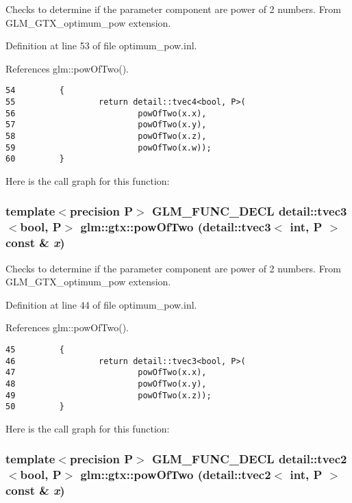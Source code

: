 Checks to determine if the parameter component are power of 2 numbers. From GLM\_\-GTX\_\-optimum\_\-pow extension. 

Definition at line 53 of file optimum\_\-pow.inl.

References glm::powOfTwo().

\begin{Code}\begin{verbatim}54         {
55                 return detail::tvec4<bool, P>(
56                         powOfTwo(x.x),
57                         powOfTwo(x.y),
58                         powOfTwo(x.z),
59                         powOfTwo(x.w));
60         }
\end{verbatim}
\end{Code}




Here is the call graph for this function:\hypertarget{group__gtx__optimum__pow_g9225089c241c18df4ff3548949f8d223}{
\subsubsection[powOfTwo]{\setlength{\rightskip}{0pt plus 5cm}template$<$precision P$>$ GLM\_\-FUNC\_\-DECL detail::tvec3$<$bool, P$>$ glm::gtx::powOfTwo (detail::tvec3$<$ int, P $>$ const \& {\em x})}}
\label{group__gtx__optimum__pow_g9225089c241c18df4ff3548949f8d223}


Checks to determine if the parameter component are power of 2 numbers. From GLM\_\-GTX\_\-optimum\_\-pow extension. 

Definition at line 44 of file optimum\_\-pow.inl.

References glm::powOfTwo().

\begin{Code}\begin{verbatim}45         {
46                 return detail::tvec3<bool, P>(
47                         powOfTwo(x.x),
48                         powOfTwo(x.y),
49                         powOfTwo(x.z));
50         }
\end{verbatim}
\end{Code}




Here is the call graph for this function:\hypertarget{group__gtx__optimum__pow_g9eb230332816fecf06fc3a6f01fcaffa}{
\subsubsection[powOfTwo]{\setlength{\rightskip}{0pt plus 5cm}template$<$precision P$>$ GLM\_\-FUNC\_\-DECL detail::tvec2$<$bool, P$>$ glm::gtx::powOfTwo (detail::tvec2$<$ int, P $>$ const \& {\em x})}}
\label{group__gtx__optimum__pow_g9eb230332816fecf06fc3a6f01fcaffa}


